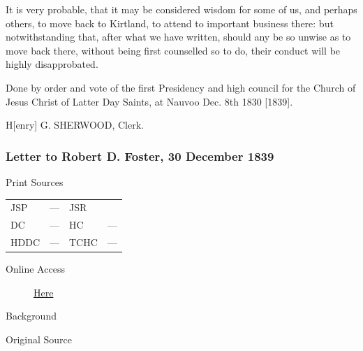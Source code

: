 				It is very probable, that it may be considered wisdom for some of us, and perhaps others, to move back to Kirtland, to attend to important business there: but notwithstanding that, after what we have written, should any be so unwise as to move back there, without being first counselled so to do, their conduct will be highly disapprobated.

				Done by order and vote of the first Presidency and high council for the Church of Jesus Christ of Latter Day Saints, at Nauvoo Dec. 8th 1830 [1839].

				\begin{tightright}
					H[enry] G. SHERWOOD, Clerk.
				\end{tightright}
				
		\subsubsection{Letter to Robert D. Foster, 30 December 1839}
			\label{EMS-1839-JS-30-DEC-1839}
			
			\begin{description}
				\item[Print Sources]
			\end{description}

				\begin{tabular}{p{0.5in}p{1in}p{0.5in}p{1in}}
				JSP	 	& ---		& JSR 		&  \\
				DC	 	& ---		& HC 		& --- \\
				HDDC 	& ---		& TCHC 		& --- \\
				\end{tabular}
			
			\begin{description}
				\item[Online Access] \href{https://www.josephsmithpapers.org/paper-summary/letter-to-robert-d-foster-30-december-1839/1}{Here}
			\end{description}
			
			\begin{description}
				\item[Background]
			\end{description}
			
			
			\begin{description}
				\item[Original Source]
			\end{description}
			
